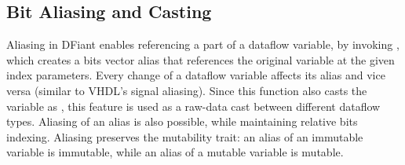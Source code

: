 




\subsection{Bit Aliasing and Casting}
Aliasing in DFiant enables referencing a part of a dataflow variable, by invoking , which creates a bits vector alias that references the original variable at the given index parameters. Every change of a dataflow variable affects its alias and vice versa (similar to VHDL's signal aliasing). Since this function also casts the variable as , this feature is used as a raw-data cast between different dataflow types. Aliasing of an alias is also possible, while maintaining relative bits indexing. Aliasing preserves the mutability trait: an alias of an immutable variable is immutable, while an alias of a mutable variable is mutable. 


